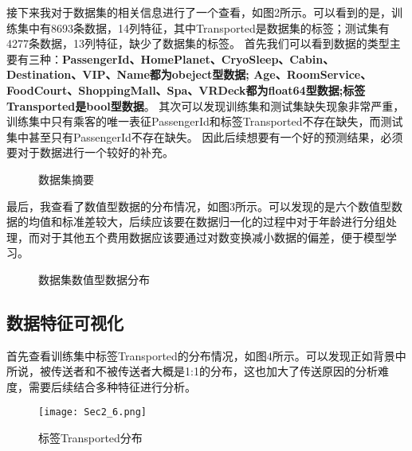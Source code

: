 \documentclass[../main.tex]{subfiles}
\begin{document}
        接下来我对于数据集的相关信息进行了一个查看，如图2所示。可以看到的是，训练集中有8693条数据，14列特征，其中Transported是数据集的标签；测试集有4277条数据，13列特征，缺少了数据集的标签。
        首先我们可以看到数据的类型主要有三种：\textbf{PassengerId、HomePlanet、CryoSleep、Cabin、Destination、VIP、Name都为obeject型数据;
        Age、RoomService、FoodCourt、ShoppingMall、Spa、VRDeck都为float64型数据;标签Transported是bool型数据}。
        其次可以发现训练集和测试集缺失现象非常严重，训练集中只有乘客的唯一表征PassengerId和标签Transported不存在缺失，而测试集中甚至只有PassengerId不存在缺失。
        因此后续想要有一个好的预测结果，必须要对于数据进行一个较好的补充。

        \begin{figure}[ht]
            \centering
            \label{tu2_2}
            \caption{数据集摘要}
        \end{figure}

        最后，我查看了数值型数据的分布情况，如图3所示。可以发现的是六个数值型数据的均值和标准差较大，后续应该要在数据归一化的过程中对于年龄进行分组处理，而对于其他五个费用数据应该要通过对数变换减小数据的偏差，便于模型学习。

        \begin{figure}[ht]
            \centering
            \label{tu2_3}
            \caption{数据集数值型数据分布}
        \end{figure}

    \subsection{数据特征可视化}

        首先查看训练集中标签Transported的分布情况，如图4所示。可以发现正如背景中所说，被传送者和不被传送者大概是1:1的分布，这也加大了传送原因的分析难度，需要后续结合多种特征进行分析。

        \begin{figure}[H]
            \centering
            \texttt{[image: Sec2\_6.png]}
            \label{tu2_4}
            \caption{标签Transported分布}
        \end{figure}
\end{document}

